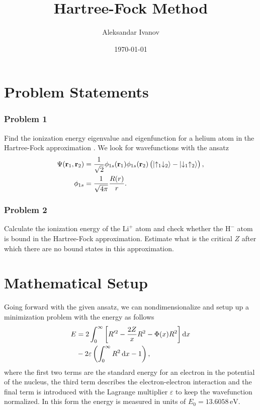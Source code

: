\documentclass[10pt,a4paper,twocolumn]{article}
\renewcommand{\vec}[1]{\bm{\mathrm{#1}}}
\begin{document}
\title{Hartree-Fock Method}
\author{Aleksandar Ivanov}
\date{\today}
\maketitle

\section{Problem Statements}

\subsubsection*{Problem 1}

Find the ionization energy eigenvalue and eigenfunction for a helium atom in the Hartree-Fock approximation \cite{hartree}. We look for wavefunctions with the ansatz
%
\begin{align}
    \Psi(\vec{r}_1, \vec{r}_2) &= \frac{1}{\sqrt{2}} \phi_{1s}(\vec{r}_1) \phi_{1s}(\vec{r}_2) \left( \ket{\uparrow_1 \downarrow_2} - \ket{\downarrow_1 \uparrow_2} \right),\notag\\
    \phi_{1s} &= \frac{1}{\sqrt{4 \pi}} \frac{R(r)}{r}.
\end{align}

\subsubsection*{Problem 2}

Calculate the ionization energy of the $\mathrm{Li}^+$ atom and check whether the $\mathrm{H}^-$ atom is bound in the Hartree-Fock approximation. Estimate what is the critical $Z$ after which there are no bound states in this approximation.


\section{Mathematical Setup}

Going forward with the given ansatz, we can nondimensionalize and setup up a minimization problem with the energy as follows
%
\begin{align}\label{eq:action}
    E &= 2 \int_0^{\infty} \left[ R'^2 - \frac{2 Z}{x}R^2 - \Phi(x)R^2\right] \dif x\notag\\
    &- 2 \varepsilon \left( \int_0^{\infty} R^2 \dif x - 1 \right),
\end{align}
%
where the first two terms are the standard energy for an electron in the potential of the nucleus, the third term describes the electron-electron interaction and the final term is introduced with the Lagrange multiplier $\varepsilon$ to keep the wavefunction normalized. In this form the energy is measured in units of $E_0 = 13.6058 \, \mathrm{eV}$.
\end{document}
